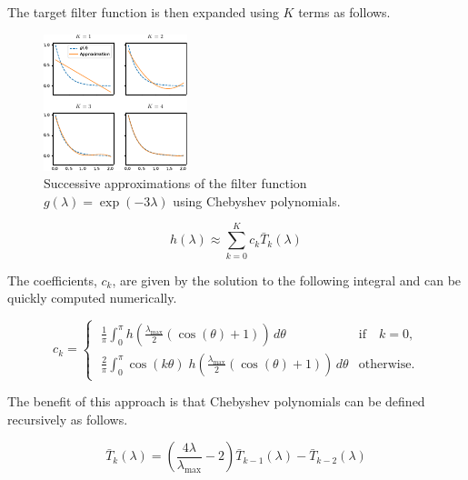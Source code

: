 The target filter function is then expanded using $K$ terms as follows. 

\begin{figure}[t]
	\centering
		\includegraphics[width=0.7\linewidth]{Figures/cheb.pdf}
	\caption[Successive approximations of a filter function using Chebyshev polynomials.]{Successive approximations of the filter function $g(\lambda) = \exp(-3\lambda)$ using Chebyshev polynomials. }
	\label{fig:Chebyshev}
\end{figure}


\begin{equation}
    h(\lambda) \approx \sum_{k=0}^K c_k \bar{T}_k(\lambda)
\end{equation}

The coefficients, $c_k$, are given by the solution to the following integral and can be quickly computed numerically. 

\begin{equation}
    \label{eq:Cheb_int}
    c_k = \begin{cases}
        \displaystyle   
        \; \frac{1}{\pi} \int_{0}^{\pi} h\left(\frac{\lambda_{\text{max}}}{2} (\cos(\theta) + 1)\right) \, d\theta & \text{if} \quad k = 0, \\[0.8cm]
        \displaystyle   
        \; \frac{2}{\pi} \int_{0}^{\pi} \cos(k \theta) \; h\left(\frac{\lambda_{\text{max}}}{2} (\cos(\theta) + 1)\right) \, d\theta & \text{otherwise.}
    \end{cases}
\end{equation}

The benefit of this approach is that Chebyshev polynomials can be defined recursively as follows. 

\begin{equation}
    \bar{T}_k(\lambda) = \left(\frac{4 \lambda }{\lambda_{\text{max}}}  - 2\right) \bar{T}_{k-1}(\lambda) - \bar{T}_{k-2}(\lambda)
\end{equation}

